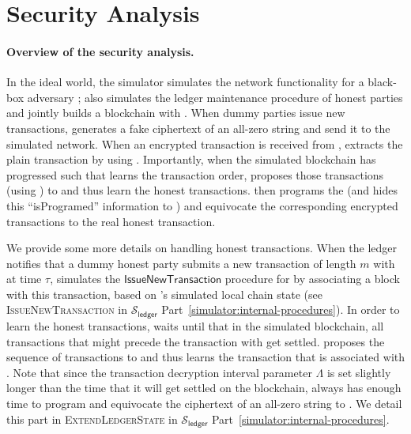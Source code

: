 \section{Security Analysis}
\label{sec:security-analysis}

\paragraph{Overview of the security analysis.}
%
In the ideal world, the simulator \simulator simulates the network functionality for a black-box adversary \adv; \simulator also simulates the ledger maintenance procedure of honest parties and jointly builds a blockchain with \adv.
%
When dummy parties issue new transactions, \simulator generates a fake ciphertext of an all-zero string and send it to the simulated network.
%
When an encrypted transaction is received from \adv, \simulator extracts the plain transaction by using \NIZK.
%
Importantly, when the simulated blockchain has progressed such that \simulator learns the transaction order, \simulator proposes those transactions (using \txid) to \funcFairLedger and thus learn the honest transactions.
%
\simulator then programs the \funcGrpoRO (and hides this ``isProgramed'' information to \adv) and equivocate the corresponding encrypted transactions to the real honest transaction.

We provide some more details on handling honest transactions.
%
When the ledger \funcFairLedger notifies \simulator that a dummy honest party \party submits a new transaction of length $m$ with \txid at time $\tau$, \simulator simulates the $\mathsf{IssueNewTransaction}$ procedure for \party by associating a block \block with this transaction, based on \party's simulated local chain state (see \textsc{IssueNewTransaction} in $\mathcal{S}_{\mathsf{ledger}}$ Part~\ref{simulator:internal-procedures}).
%
In order to learn the honest transactions, \simulator waits until that in the simulated blockchain, all transactions that might precede the transaction with \txid get settled.
%
\simulator proposes the sequence of transactions to \funcFairLedger and thus learns the transaction \tx that is associated with \txid.
%
Note that since the transaction decryption interval parameter $\Lambda$ is set slightly longer than the time that it will get settled on the blockchain, \simulator always has enough time to program \funcGrpoRO and equivocate the ciphertext of an all-zero string to \tx.
%
We detail this part in \textsc{ExtendLedgerState} in $\mathcal{S}_{\mathsf{ledger}}$ Part~\ref{simulator:internal-procedures}.

